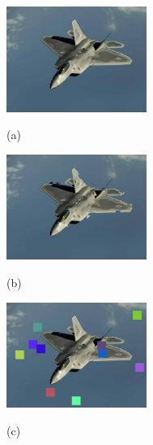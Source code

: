 	\begin{figure}[!]
		\centering
		\begin{minipage}[t]{.32\linewidth}
			\includegraphics[width=1.8in]{KADID/I38.jpg}
			\centerline{(a)}
		\end{minipage}
		\begin{minipage}[t]{.32\linewidth}
			\includegraphics[width=1.8in]{KADID/I38_20_05.jpg}
			\centerline{(b)}
		\end{minipage}
		\begin{minipage}[t]{.32\linewidth}
			\includegraphics[width=1.8in]{KADID/I38_23_05.jpg}
			\centerline{(c)}
		\end{minipage}
		

\end{figure}
